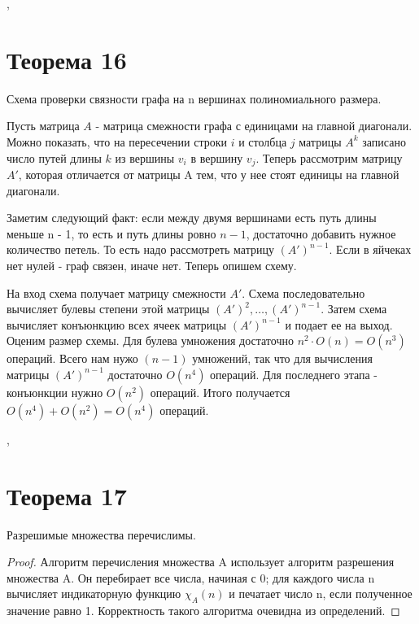 \documentclass[a4paper,12pt]{article}
\begin{document}
    
    \sep
    
    \section{Теорема 16}
    Схема проверки связности графа на n вершинах полиномиального размера.
    
    
    Пусть матрица $A$ - матрица смежности графа с единицами на главной диагонали.
    Можно показать, что на пересечении строки $i$ и столбца $j$ матрицы $A^{k}$
    записано число путей длины $k$ из вершины $v_i$ в вершину $v_j$.
    Теперь рассмотрим матрицу $A'$, которая отличается от матрицы A тем, что
    у нее стоят единицы на главной диагонали.
    
    Заметим следующий факт: если между двумя вершинами есть путь длины меньше n - 1,
    то есть и путь длины
    ровно $n-1$, достаточно добавить нужное количество петель. То есть надо рассмотреть
    матрицу $(A')^{n-1}$. Если в яйчеках нет нулей - граф связен, иначе нет. Теперь
    опишем схему.
    
    На вход схема получает матрицу смежности $A'$. Схема последовательно
    вычисляет булевы степени этой матрицы $(A')^2,\ldots,(A')^{n-1}$. Затем
    схема вычисляет конъюнкцию всех ячеек матрицы $(A')^{n-1}$ и подает ее на выход.\\
    
    Оценим размер схемы. Для булева умножения достаточно $n^2\cdot O(n) = O(n^3)$
    операций. Всего нам нужо $(n-1)$ умножений, так что для вычисления матрицы $(A')^{n-1}$
    достаточно $O(n^4)$ операций. Для последнего этапа - конъюнкции нужно $O(n^2)$
    операций. Итого получается $O(n^4)+O(n^2) = O(n^4)$ операций.
    
    \sep
    \section{Теорема 17}
    \begin{theorem}
        Разрешимые множества перечислимы.
    \end{theorem}
    \begin{proof}
    Алгоритм перечисления множества A использует алгоритм разрешения множества A.
    Он перебирает все числа, начиная с 0; для каждого числа n вычисляет индикаторную
    функцию $\chi_A(n)$ и печатает число n, если полученное значение равно 1.
    Корректность такого алгоритма очевидна из определений.
    \end{proof}
\end{document}
